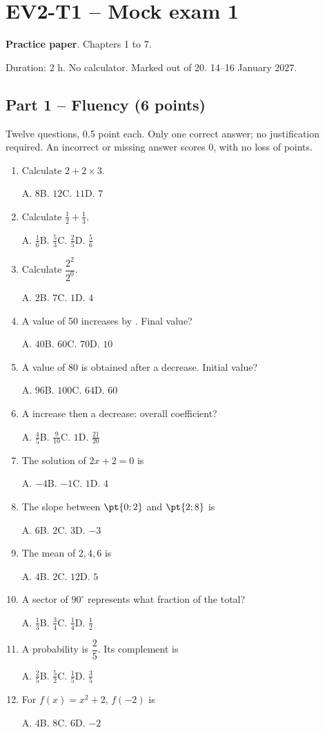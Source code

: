 \mxnewpage\section*{EV2-T1 -- Mock exam 1}\label{EV2-T1}
\textbf{Practice paper}. Chapters 1 to 7.\par Duration: 2 h. No calculator. Marked out of 20. 14--16 January 2027.
\subsection*{Part 1 -- Fluency (6 points)}
Twelve questions, \num{0,5} point each. Only one correct answer; no justification required. An incorrect or missing answer scores 0, with no loss of points.
\begin{enumerate}
\item Calculate $2+2\times3$.\par A. $8$\quad B. $12$\quad C. $11$\quad D. $7$
\item Calculate $\frac12+\frac13$.\par A. $\frac{1}{6}$\quad B. $\frac{5}{3}$\quad C. $\frac{2}{5}$\quad D. $\frac{5}{6}$
\item Calculate $\dfrac{2^2}{2^{0}}$.\par A. $2$\quad B. $7$\quad C. $1$\quad D. $4$
\item A value of 50 increases by . Final value?\par A. $40$\quad B. $60$\quad C. $70$\quad D. $10$
\item A value of 80 is obtained after a  decrease. Initial value?\par A. $96$\quad B. $100$\quad C. $64$\quad D. $60$
\item A  increase then a  decrease: overall coefficient?\par A. $\frac{4}{5}$\quad B. $\frac{9}{10}$\quad C. $1$\quad D. $\frac{21}{20}$
\item The solution of $2x+2=0$ is\par A. $-4$\quad B. $-1$\quad C. $1$\quad D. $4$
\item The slope between $\pt{0;2}$ and $\pt{2;8}$ is\par A. $6$\quad B. $2$\quad C. $3$\quad D. $-3$
\item The mean of $2, 4, 6$ is\par A. $4$\quad B. $2$\quad C. $12$\quad D. $5$
\item A sector of $90^\circ$ represents what fraction of the total?\par A. $\frac{1}{3}$\quad B. $\frac{3}{4}$\quad C. $\frac{1}{4}$\quad D. $\frac{1}{2}$
\item A probability is $\dfrac{2}{5}$. Its complement is\par A. $\frac{2}{5}$\quad B. $\frac{5}{2}$\quad C. $\frac{1}{5}$\quad D. $\frac{3}{5}$
\item For $f(x)=x^2+2$, $f(-2)$ is\par A. $4$\quad B. $8$\quad C. $6$\quad D. $-2$
\end{enumerate}
